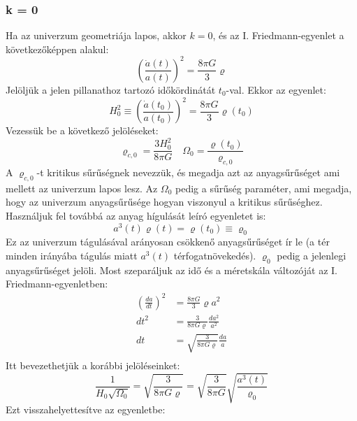 \documentclass[../main.tex]{subfiles}
\begin{document}
\subsubsection*{k = 0}
Ha az univerzum geometriája lapos, akkor $k = 0$, és az I. Friedmann-egyenlet a következőképpen alakul:
\begin{equation}
    \left(\frac{\dot{a}(t)}{a(t)}\right)^2 = \frac{8 \pi G}{3} \varrho
\end{equation}
Jelöljük a jelen pillanathoz tartozó időkördinátát $t_0$-val. Ekkor az egyenlet:
\begin{equation}
    H^2_0 \equiv \left(\frac{\dot{a}(t_0)}{a(t_0)}\right)^2 = \frac{8 \pi G}{3} \varrho(t_0)
\end{equation}
Vezessük be a következő jelöléseket:
\begin{equation}
    \varrho_{c, 0} = \frac{3 H^2_0}{8 \pi G} \quad \Omega_0 = \frac{\varrho(t_0)}{\varrho_{c, 0}}
\end{equation}
A $\varrho_{c, 0}$-t kritikus sűrűségnek nevezzük, és megadja azt az anyagsűrűséget ami mellett az univerzum lapos lesz. Az $\Omega_0$ pedig a sűrűség paraméter, ami megadja, hogy az univerzum anyagsűrűsége hogyan viszonyul a kritikus sűrűséghez. 
Használjuk fel továbbá az anyag hígulását leíró egyenletet is:
\begin{equation}
    a^3(t) \varrho(t) = \varrho(t_0) \equiv \varrho_0
\end{equation}
Ez az univerzum tágulásával arányosan csökkenő anyagsűrűséget ír le (a tér minden irányába tágulás miatt $a^3(t)$ térfogatnövekedés). $\varrho_0$ pedig a jelenlegi anyagsűrűséget jelöli. 
Most szeparáljuk az idő és a méretskála változóját az I. Friedmann-egyenletben:
\begin{equation}
    \begin{aligned}
        \left(\frac{d a}{d t}\right)^2 &= \frac{8 \pi G}{3} \varrho a^2 \\
        dt^2 &= \frac{3}{8 \pi G \varrho} \frac{d a^2}{a^2} \\
        dt &= \sqrt{\frac{3}{8 \pi G \varrho}} \frac{d a}{a} \\
    \end{aligned}
\end{equation}
Itt bevezethetjük a korábbi jelöléseinket:
\begin{equation}
    \frac{1}{H_0 \sqrt{\Omega_0}} = \sqrt{\frac{3}{8 \pi G \varrho}} = \sqrt{\frac{3}{8 \pi G}} \sqrt{\frac{a^3(t)}{\varrho_0}}
\end{equation}
Ezt visszahelyettesítve az egyenletbe:
\end{document}
